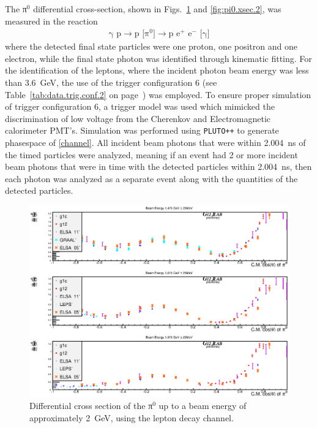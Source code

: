 The π$^0$ differential cross-section, shown in Figs.~\ref{fig:pi0.xsec.1} and \ref{fig:pi0.xsec.2}, was measured in the reaction
\begin{align}\label{channel}
\text{γ p} \rightarrow \text{p [π$^0$]} \rightarrow \text{p e$^+$ e$^-$ [γ]}
\end{align}
where the detected final state particles were one proton, one positron and one electron, while the final state photon was identified through kinematic fitting. For the identification of the leptons, where the incident photon beam energy was less than 3.6~GeV, the use of the trigger configuration 6 (see Table~\ref{tab:data.trig.conf.2} on page~\pageref{tab:data.trig.conf.2}) was employed. To ensure proper simulation of trigger configuration 6, a trigger model was used which mimicked the discrimination of low voltage from the Cherenkov and Electromagnetic calorimeter PMT's. Simulation was performed using \verb#PLUTO++# to generate phasespace of \ref{channel}. All incident beam photons that were within 2.004~ns of the timed particles were analyzed, meaning if an event had 2 or more incident beam photons that were in time with the detected particles within 2.004~ns, then each photon was analyzed as a separate event along with the quantities of the detected particles.

\begin{figure}[htpb]
\includegraphics[width=0.95\columnwidth]{figures/xsec/G12_Pi0_XSection_forAnalysisNote_I.eps}
\caption{\label{fig:pi0.xsec.1}Differential cross section of the π$^0$ up to a beam energy of approximately 2~GeV, using the lepton decay channel.}
\end{figure}

